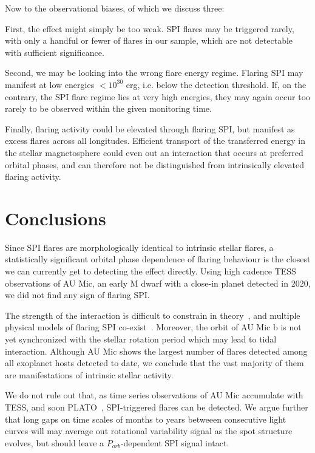 \documentclass[fleqn,usenatbib,letters]{mnras}%
\begin{document}
Now to the observational biases, of which we discuss three:

First, the effect might simply be too weak. SPI flares may be triggered rarely, with only a handful or fewer of flares in our sample, which are not detectable with sufficient significance. 

Second, we may be looking into the wrong flare energy regime. Flaring SPI may manifest at low energies $<10^30$ erg, i.e. below the detection threshold. If, on the contrary, the SPI flare regime lies at very high energies, they may again occur too rarely to be observed within the given monitoring time.

Finally, flaring activity could be elevated through flaring SPI, but manifest as excess flares across all longitudes. Efficient transport of the transferred energy in the stellar magnetosphere could even out an interaction that occurs at preferred orbital phases, and can therefore not be distinguished from intrinsically elevated flaring activity.

\section{Conclusions}
\label{sec:conclusions}
Since SPI flares are morphologically identical to intrinsic stellar flares, a statistically significant orbital phase dependence of flaring behaviour is the closest we can currently get to detecting the effect directly. Using high cadence TESS observations of AU Mic, an early M dwarf with a close-in planet detected in 2020, we did not find any sign of flaring SPI.

The strength of the interaction is difficult to constrain in theory~\citep{strugarek2019}, and multiple physical models of flaring SPI co-exist~\citep{lanza2018close-by, saur2013}. Moreover, the orbit of AU Mic b is not yet synchronized with the stellar rotation period which may lead to tidal interaction. Although AU Mic shows the largest number of flares detected among all exoplanet hosts detected to date, we conclude that the vast majority of them are manifestations of intrinsic stellar activity. 

We do not rule out that, as time series observations of AU Mic accumulate with TESS, and soon PLATO~\citep{rauer2014plato}, SPI-triggered flares can be detected. We argue further that long gaps on time scales of months to years betweeen consecutive light curves will may average out rotational variability signal as the spot structure evolves, but should leave a $P_{orb}$-dependent SPI signal intact. 
\end{document}
